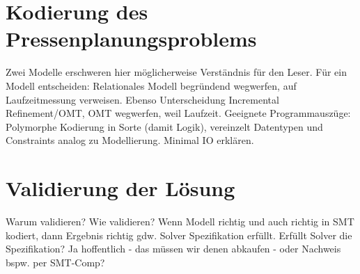 \section{Kodierung des Pressenplanungsproblems}
Zwei Modelle erschweren hier möglicherweise Verständnis für den Leser.
Für ein Modell entscheiden: Relationales Modell begründend wegwerfen, auf Laufzeitmessung verweisen.
Ebenso Unterscheidung Incremental Refinement/OMT, OMT wegwerfen, weil Laufzeit.
Geeignete Programmauszüge: Polymorphe Kodierung in Sorte (damit Logik), vereinzelt Datentypen und Constraints analog zu Modellierung.
Minimal IO erklären.

\section{Validierung der Lösung}
Warum validieren?
Wie validieren?
Wenn Modell richtig und auch richtig in SMT kodiert, dann Ergebnis richtig gdw. Solver Spezifikation erfüllt.
Erfüllt Solver die Spezifikation? Ja hoffentlich - das müssen wir denen abkaufen - oder Nachweis bspw. per SMT-Comp?